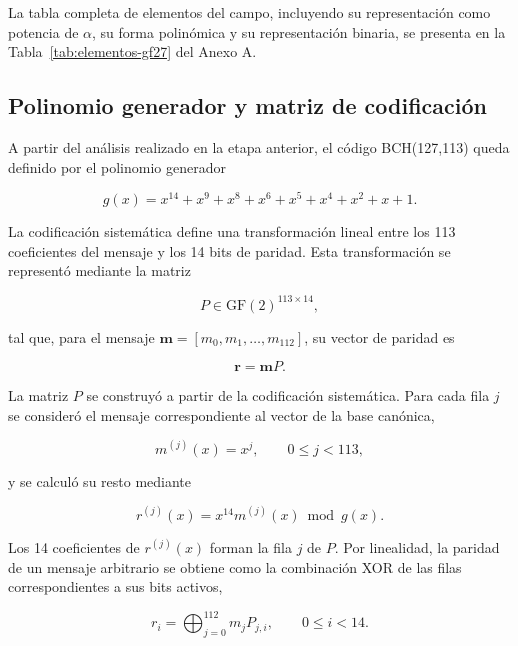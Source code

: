 \documentclass[10pt,a4paper]{article}
\begin{document}
La tabla completa de elementos del campo, incluyendo su representación como
potencia de $\alpha$, su forma polinómica y su representación binaria, se
presenta en la Tabla~\ref{tab:elementos-gf27} del Anexo A.

\subsection{Polinomio generador y matriz de codificación}

A partir del análisis realizado en la etapa anterior, el código BCH(127,113)
queda definido por el polinomio generador

\begin{equation}
    g(x)
    =
    x^{14}+x^9+x^8+x^6+x^5+x^4+x^2+x+1.
    \label{eq:generador-bch-127-113-etapa1}
\end{equation}

La codificación sistemática define una transformación lineal entre los 113
coeficientes del mensaje y los 14 bits de paridad. Esta transformación se
representó mediante la matriz

\begin{equation}
    P\in\mathrm{GF}(2)^{113\times14},
\end{equation}

tal que, para el mensaje
$\mathbf{m}=[m_0,m_1,\ldots,m_{112}]$, su vector de paridad es

\begin{equation}
    \mathbf{r}=\mathbf{m}P.
    \label{eq:matriz-paridad-bch}
\end{equation}

La matriz $P$ se construyó a partir de la codificación sistemática. Para cada
fila $j$ se consideró el mensaje correspondiente al vector de la base
canónica,

\begin{equation}
    m^{(j)}(x)=x^j,
    \qquad 0\leq j<113,
\end{equation}

y se calculó su resto mediante

\begin{equation}
    r^{(j)}(x)
    =
    x^{14}m^{(j)}(x)\bmod g(x).
\end{equation}

Los 14 coeficientes de $r^{(j)}(x)$ forman la fila $j$ de $P$. Por
linealidad, la paridad de un mensaje arbitrario se obtiene como la combinación
XOR de las filas correspondientes a sus bits activos,

\begin{equation}
    r_i
    =
    \bigoplus_{j=0}^{112} m_jP_{j,i},
    \qquad 0\leq i<14.
    \label{eq:ecuacion-paridad-paralela}
\end{equation}
\end{document}
